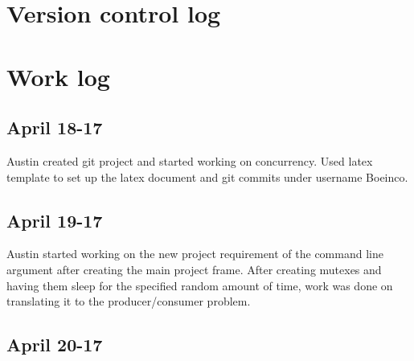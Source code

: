 \documentclass[letterpaper,10pt,titlepage]{article}
\begin{document}
\section{Version control log}
\begin{versionhistory}
\end{versionhistory}

\section{Work log}
\subsection{April 18-17}
Austin created git project and started working on concurrency.  Used latex template to set up the latex document and git commits under username Boeinco.
\subsection{April 19-17}
Austin started working on the new project requirement of the command line argument after creating the main project frame.  After creating mutexes and having them sleep for the specified random amount of time, work was done on translating it to the producer/consumer problem.
\subsection{April 20-17}

%
%
\end{document}
